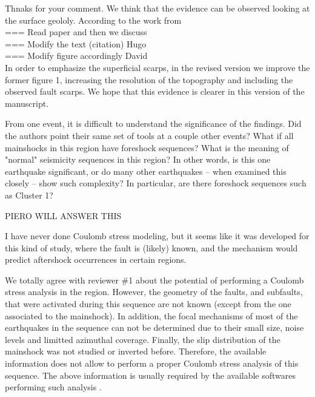 \documentclass[10pt]{extarticle}
\begin{document}
\begin{Answer}
Thnaks for your comment. We think that the evidence can be observed looking at the surface geololy. According to the work from \cite{Falcucci2016active} \\
\hfill === Read paper and then we discuss \\ 
\hfill ===  Modify the text (citation) Hugo \\
\hfill ===  Modify figure accordingly  David\\
In order to emphasize the superficial scarps, in the revised version we improve the former figure 1, increasing the resolution of the topography and including the observed fault scarps. We hope that this evidence is clearer in this version of the manuscript.
 \WorkInProgressRevTask
\end{Answer}
%
%



\begin{ReviewerComment}{1}
\noindent 
From one event, it is difficult to understand the significance of the findings. Did the authors point their same set of tools at a couple other events? What if all mainshocks in this region have foreshock sequences? What is the meaning of "normal" seismicity sequences in this region? In other words, is this one earthquake significant, or do many other earthquakes -- when examined this closely -- show such complexity? In particular, are there foreshock sequences such as Cluster 1?

\end{ReviewerComment}


\begin{Answer}
\hfill PIERO WILL ANSWER THIS
 \WorkInProgressRevTask
\end{Answer}
%
%



\begin{ReviewerComment}{1}
\noindent 
I have never done Coulomb stress modeling, but it seems like it was developed for this kind of study, where the fault is (likely) known, and the mechanism would predict aftershock occurrences in certain regions.
\end{ReviewerComment}


\begin{Answer}
We totally agree with reviewer \#1 about the potential of performing a Coulomb stress analysis in the region. However, the geometry of the faults, and subfaults, that were activated during this sequence are not known (except from the one associated to the mainshock). In addition, the focal mechanisms of most of the earthquakes in the sequence can not be determined due to their small size, noise levels and limitted azimuthal coverage. Finally, the slip distribution of the mainshock was not studied or inverted before. Therefore, the available information does not allow to perform a proper Coulomb stress analysis of this sequence. The above information is usually required by the available softwares performing such analysis \citep{toda2011coulomb}.
 \WorkInProgressRevTask
\end{Answer}
%
%
\end{document}
